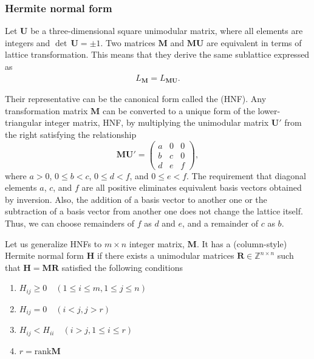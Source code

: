 \subsubsection{Hermite normal form}

Let $\bm{U}$ be a three-dimensional square unimodular matrix, where all elements are integers and $\det \, \bm{U} = \pm 1$.
Two matrices $\bm{M}$ and $\bm{MU}$ are equivalent in terms of lattice transformation.
This means that they derive the same sublattice expressed as
\begin{align}
    L_{\bm{M}} = L_{\bm{MU}}.
\end{align}

Their representative can be the canonical form called the  (HNF).
Any transformation matrix $\mathbf{M}$ can be converted to a unique form of the lower-triangular integer matrix, HNF, by multiplying the unimodular matrix $\mathbf{U'}$ from the right satisfying the relationship
\begin{equation}
    \label{eq:HNF}
    \mathbf{MU'} =
    \left(
    \begin{array}{ccc}
         a & 0 & 0 \\
         b & c & 0 \\
         d & e & f
    \end{array}
    \right),
\end{equation}
where $a > 0$, $0 \leq b < c$, $0 \leq d < f$, and $0 \leq e < f$.
The requirement that diagonal elements $a$, $c$, and $f$ are all positive eliminates equivalent basis vectors obtained by inversion.
Also, the addition of a basis vector to another one or the subtraction of a basis vector from another one does not change the lattice itself.
Thus, we can choose remainders of $f$ as $d$ and $e$, and a remainder of $c$ as $b$.

Let us generalize HNFs to $m \times n$ integer matrix, $\bm{M}$.
It has a (column-style) Hermite normal form $\bm{H}$ if there exists a unimodular matrices $\bm{R} \in \mathbb{Z}^{n \times n}$ such that $\bm{H}=\bm{MR}$ satisfied the following conditions
\begin{enumerate}
    \item $H_{ij} \geq 0 \quad (1 \leq i \leq m, 1 \leq j \leq n)$
    \item $H_{ij} = 0 \quad (i < j , j > r)$
    \item $H_{ij} < H_{ii} \quad (i > j, 1 \leq i \leq r)$
    \item $r = \mathrm{rank} \bm{M}$
\end{enumerate}

